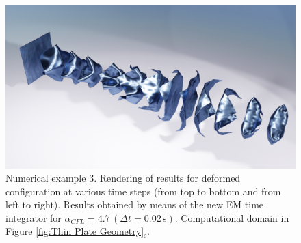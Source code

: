 

\begin{figure}[hbtp!]
	\centering
		\includegraphics[width=1.0\textwidth]{Figures/Example2/Blenderimage1}	
	\caption{Numerical example 3. Rendering of results for deformed configuration at various time steps (from top to bottom and from left to right). Results obtained by means of the new EM time integrator for $\alpha_{CFL}=4.7\,(\Delta t =0.02 \,\text{s})$. Computational domain in Figure \ref{fig:Thin Plate Geometry}$_c$.}
	\label{fig:example 2 deformed configuration}
\end{figure}


